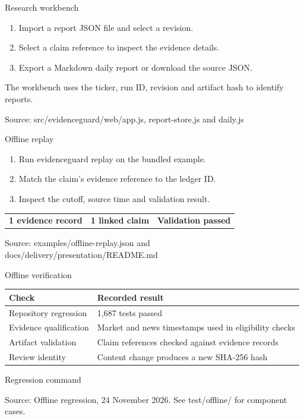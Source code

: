 \documentclass[aspectratio=169,11pt,t]{beamer}
\newcommand{\source}[1]{\par\vfill{\fontsize{6.6}{8}\selectfont\color{CityUMuted}Source: #1\par}}
\newcommand{\code}[1]{{\ttfamily\small #1}}
\begin{document}
\begin{frame}{Research workbench}
 \begin{enumerate}\setlength\itemsep{9pt}
 \item Import a report JSON file and select a revision.
 \item Select a claim reference to inspect the evidence details.
 \item Export a Markdown daily report or download the source JSON.
 \end{enumerate}
 \medskip The workbench uses the ticker, run ID, revision and artifact hash to identify reports.
 \source{src/evidenceguard/web/app.js, report-store.js and daily.js}
\end{frame}

\begin{frame}{Offline replay}
 \begin{enumerate}\setlength\itemsep{8pt}
 \item Run \code{evidenceguard replay} on the bundled example.
 \item Match the claim's evidence reference to the ledger ID.
 \item Inspect the cutoff, source time and validation result.
 \end{enumerate}
 \medskip
 \begin{tabularx}{\textwidth}{@{}YYY@{}}
 \textbf{1 evidence record}&\textbf{1 linked claim}&\textbf{Validation passed}
 \end{tabularx}
 \source{examples/offline-replay.json and docs/delivery/presentation/README.md}
\end{frame}

\begin{frame}{Offline verification}
 \small
 \begin{tabularx}{\textwidth}{@{}L{.32\textwidth}Y@{}}
 \toprule Check & Recorded result\\\midrule
 Repository regression & 1,687 tests passed\\[6pt]
 Evidence qualification & Market and news timestamps used in eligibility checks\\[6pt]
 Artifact validation & Claim references checked against evidence records\\[6pt]
 Review identity & Content change produces a new SHA-256 hash\\\bottomrule
 \end{tabularx}
 \par\medskip\normalsize Regression command\quad \code{python -m pytest}
 \source{Offline regression, 24 November 2026. See test/offline/ for component cases.}
\end{frame}
\end{document}
